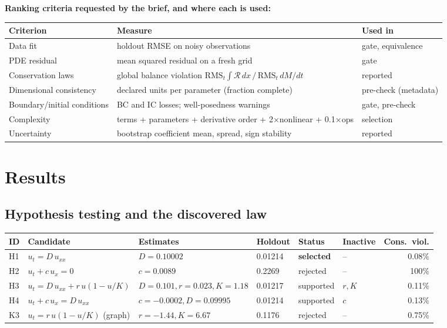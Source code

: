 \documentclass[11pt,a4paper]{article}
\begin{document}
\textbf{Ranking criteria requested by the brief, and where each is used:}
\begin{center}
\small
\begin{tabular}{@{}L{3.3cm}L{9.0cm}L{3.0cm}@{}}
\toprule
\textbf{Criterion} & \textbf{Measure} & \textbf{Used in} \\ \midrule
Data fit & holdout RMSE on noisy observations & gate, equivalence \\
PDE residual & mean squared residual on a fresh grid & gate \\
Conservation laws & global balance violation $\mathrm{RMS}_t\!\int\!\mathcal R\,dx \,/\, \mathrm{RMS}_t\, dM/dt$ & reported \\
Dimensional consistency & declared units per parameter (fraction complete) & pre-check (metadata) \\
Boundary/initial conditions & BC and IC losses; well-posedness warnings & gate, pre-check \\
Complexity & terms + parameters + derivative order + 2$\times$nonlinear + 0.1$\times$ops & selection \\
Uncertainty & bootstrap coefficient mean, spread, sign stability & reported \\
\bottomrule
\end{tabular}
\end{center}

\section{Results}

\subsection{Hypothesis testing and the discovered law}

\begin{center}
\footnotesize
\setlength{\tabcolsep}{3.5pt}
\begin{tabular}{@{}llllllr@{}}
\toprule
\textbf{ID} & \textbf{Candidate} & \textbf{Estimates} & \textbf{Holdout} & \textbf{Status} & \textbf{Inactive} & \textbf{Cons.\ viol.} \\ \midrule
H1 & $u_t = D\,u_{xx}$ & $D=0.10002$ & 0.01214 & \textbf{selected} & -- & 0.08\% \\
H2 & $u_t + c\,u_x = 0$ & $c=0.0089$ & 0.2269 & rejected & -- & 100\% \\
H3 & $u_t = D\,u_{xx} + r\,u(1-u/K)$ & $D{=}0.101, r{=}0.023, K{=}1.18$ & 0.01217 & supported & $r, K$ & 0.11\% \\
H4 & $u_t + c\,u_x = D\,u_{xx}$ & $c{=}{-0.0002}, D{=}0.09995$ & 0.01214 & supported & $c$ & 0.13\% \\
K3 & $u_t = r\,u(1-u/K)$ (graph) & $r{=}{-1.44}, K{=}6.67$ & 0.1176 & rejected & -- & 0.75\% \\
\bottomrule
\end{tabular}
\end{center}
\end{document}

